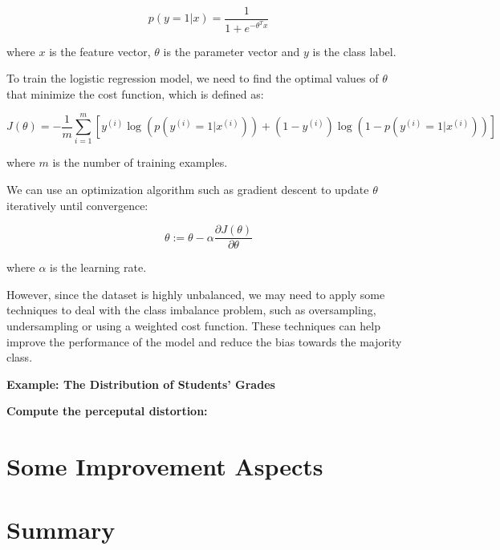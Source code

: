 	\[p(y=1|x) = \frac{1}{1+e^{-\theta^Tx}}\]
	
	where $x$ is the feature vector, $\theta$ is the parameter vector and $y$ is the class label.
	
	To train the logistic regression model, we need to find the optimal values of $\theta$ that minimize the cost function, which is defined as:
	
	\[J(\theta) = -\frac{1}{m}\sum_{i=1}^m[y^{(i)}\log(p(y^{(i)}=1|x^{(i)}))+(1-y^{(i)})\log(1-p(y^{(i)}=1|x^{(i)}))]\]
	
	where $m$ is the number of training examples.
	
	We can use an optimization algorithm such as gradient descent to update $\theta$ iteratively until convergence:
	
	\[\theta := \theta - \alpha \frac{\partial J(\theta)}{\partial \theta}\]
	
	where $\alpha$ is the learning rate.
	
	However, since the dataset is highly unbalanced, we may need to apply some techniques to deal with the class imbalance problem, such as oversampling, undersampling or using a weighted cost function. These techniques can help improve the performance of the model and reduce the bias towards the majority class.
	

	
\textbf{Example: The Distribution of Students' Grades }


\textbf{Compute the perceputal distortion:}

\section{Some Improvement Aspects}




\section{Summary}







